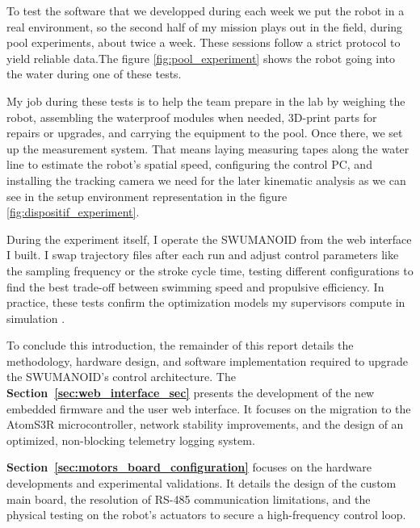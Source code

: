 \documentclass{tropLaClasse}
\begin{document}
\vspace{-0.2cm}

To test the software that we developped during each week we put the robot in a real environment, so the second half of my mission plays out in the field, during pool experiments, about twice a week. These sessions follow a strict protocol to yield reliable data.The figure \ref{fig:pool_experiment} shows the robot going into the water during one of these tests. \label{text:pool_experiment}



My job during these tests is to help the team prepare in the lab by weighing the robot, assembling the waterproof modules when needed, 3D-print parts for repairs or upgrades, and carrying the equipment to the pool. Once there, we set up the measurement system. That means laying measuring tapes along the water line to estimate the robot's spatial speed, configuring the control PC, and installing the tracking camera we need for the later kinematic analysis as we can see in the setup environment representation in the figure \ref{fig:dispositif_experiment}. \label{text:dispositif_experiment}



During the experiment itself, I operate the SWUMANOID from the web interface I built. I swap trajectory files after each run and adjust control parameters like the sampling frequency or the stroke cycle time, testing different configurations to find the best trade-off between swimming speed and propulsive efficiency. In practice, these tests confirm the optimization models my supervisors compute in simulation \cite{nakashima2012optimizing}.


To conclude this introduction, the remainder of this report details the methodology, hardware design, and software implementation required to upgrade the SWUMANOID's control architecture. The \textbf{Section~\ref{sec:web_interface_sec}} presents the development of the new embedded firmware and the user web interface. It focuses on the migration to the AtomS3R microcontroller, network stability improvements, and the design of an optimized, non-blocking telemetry logging system. 

\textbf{Section~\ref{sec:motors_board_configuration}} focuses on the hardware developments and experimental validations. It details the design of the custom main board, the resolution of RS-485 communication limitations, and the physical testing on the robot's actuators to secure a high-frequency control loop. 
\end{document}
